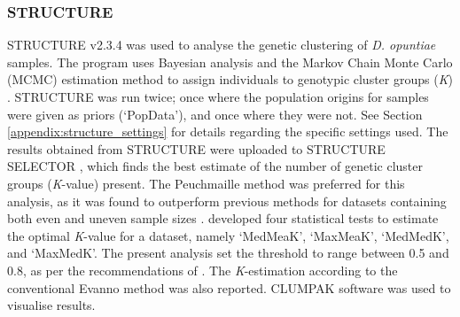 \subsubsection{STRUCTURE}
STRUCTURE v2.3.4 \citep{Pritchard2000InferenceData, evanno2005detecting} was used to analyse the genetic clustering of \textit{D. opuntiae} samples. 
The program uses Bayesian analysis and the Markov Chain Monte Carlo (MCMC) estimation method to assign individuals to genotypic cluster groups (\textit{K}) \citep{Pritchard2000InferenceData}. 
STRUCTURE was run twice; once where the population origins for samples were given as priors (`PopData'), and once where they were not. 
See Section \ref{appendix:structure_settings} for details regarding the specific settings used. 
The results obtained from STRUCTURE were uploaded to STRUCTURE SELECTOR \citep{li2018structureselector}, which finds the best estimate of the number of genetic cluster groups (\textit{K}-value) present. The Peuchmaille method was preferred for this analysis, as it was found to outperform previous methods for datasets containing both even and uneven sample sizes \citep{puechmaille2016program}. \citet{puechmaille2016program} developed four statistical tests to estimate the optimal \textit{K}-value for a dataset, namely `MedMeaK', `MaxMeaK', `MedMedK', and `MaxMedK'. 
The present analysis set the threshold to range between 0.5 and 0.8, as per the recommendations of \citet{puechmaille2016program}. The \textit{K}-estimation according to the conventional Evanno method \citep{evanno2005detecting} was also reported. CLUMPAK software \citep{Kopelman2015} was used to visualise results. 


